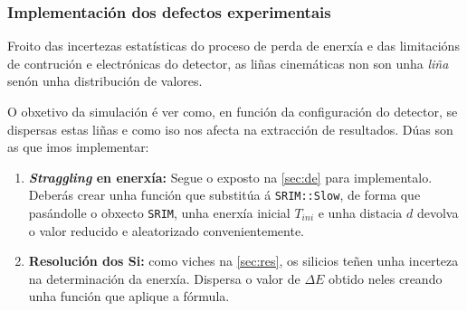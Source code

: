 \documentclass[11pt, a4paper]{article}
\begin{document}
\subsubsection*{Implementación dos defectos experimentais}
Froito das incertezas estatísticas do proceso de perda de enerxía e das limitacións de contrución e electrónicas do detector, as liñas cinemáticas non son unha \textit{liña} senón unha distribución de valores.

O obxetivo da simulación é ver como, en función da configuración do detector, se dispersas estas liñas e como iso nos afecta na extracción de resultados. Dúas son as que imos implementar:
\begin{enumerate}
    \item \textbf{\textit{Straggling} en enerxía:} Segue o exposto na \autoref{sec:de} para implementalo. Deberás crear unha función que substitúa á \lstinline|SRIM::Slow|, de forma que pasándolle o obxecto \lstinline|SRIM|, unha enerxía inicial $T_{ini}$ e unha distacia $d$ devolva o valor reducido e aleatorizado convenientemente.
    \item \textbf{Resolución dos Si:} como viches na \autoref{sec:res}, os silicios teñen unha incerteza na determinación da enerxía. Dispersa o valor de $\Delta E$ obtido neles creando unha función que aplique a fórmula. 
\end{enumerate}
\end{document}

